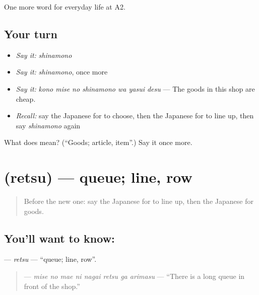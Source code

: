 \begin{grammarlens}[title={What you've built}]
One more word for everyday life at A2.
\end{grammarlens}

\subsection*{Your turn}
\begin{itemize}
\raggedright
  \item \emph{Say it:} \emph{shinamono}
  \item \emph{Say it:} \emph{shinamono}, once more
  \item \emph{Say it:} \emph{kono mise no shinamono wa yasui desu} — The goods in this shop are cheap.
  \item \emph{Recall:} say the Japanese for to choose, then the Japanese for to line up, then say \emph{shinamono} again
\end{itemize}

\begin{tcolorbox}[breakable,colback=teal!4,colframe=teal!35!black,title={Before you move on}]
What does  mean? (\textquotedblleft{}Goods; article, item\textquotedblright{}.) Say it once more.
\end{tcolorbox}
\section[\texorpdfstring{\ja{れつ} (retsu)}{れつ (retsu)}]{ (retsu) — queue; line, row}

\label{lesson:JA-C184-retsu}



\begin{quote}
Before the new one: say the Japanese for to line up, then the Japanese for goods.
\end{quote}

\subsection*{You'll want to know: }
\textbf{} — \emph{retsu} — \textquotedblleft{}queue; line, row\textquotedblright{}.

\begin{quote}
\textbf{    } — \emph{mise no mae ni nagai retsu ga arimasu} — \textquotedblleft{}There is a long queue in front of the shop.\textquotedblright{}
\end{quote}

